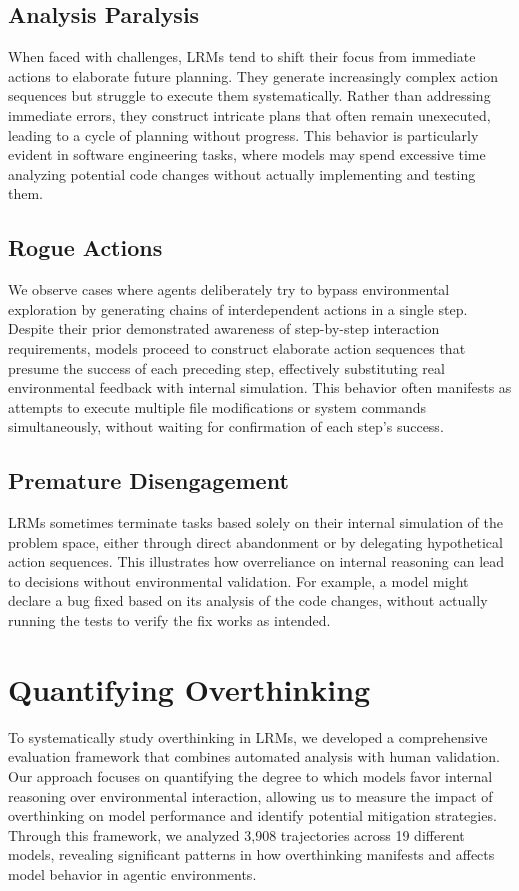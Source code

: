 \subsection{Analysis Paralysis}
When faced with challenges, LRMs tend to shift their focus from immediate actions to elaborate future planning. They generate increasingly complex action sequences but struggle to execute them systematically. Rather than addressing immediate errors, they construct intricate plans that often remain unexecuted, leading to a cycle of planning without progress. This behavior is particularly evident in software engineering tasks, where models may spend excessive time analyzing potential code changes without actually implementing and testing them.

\subsection{Rogue Actions}
We observe cases where agents deliberately try to bypass environmental exploration by generating chains of interdependent actions in a single step. Despite their prior demonstrated awareness of step-by-step interaction requirements, models proceed to construct elaborate action sequences that presume the success of each preceding step, effectively substituting real environmental feedback with internal simulation. This behavior often manifests as attempts to execute multiple file modifications or system commands simultaneously, without waiting for confirmation of each step's success.

\subsection{Premature Disengagement}
LRMs sometimes terminate tasks based solely on their internal simulation of the problem space, either through direct abandonment or by delegating hypothetical action sequences. This illustrates how overreliance on internal reasoning can lead to decisions without environmental validation. For example, a model might declare a bug fixed based on its analysis of the code changes, without actually running the tests to verify the fix works as intended.

\section{Quantifying Overthinking}
\label{sec:quantifying}

To systematically study overthinking in LRMs, we developed a comprehensive evaluation framework that combines automated analysis with human validation. Our approach focuses on quantifying the degree to which models favor internal reasoning over environmental interaction, allowing us to measure the impact of overthinking on model performance and identify potential mitigation strategies. Through this framework, we analyzed 3,908 trajectories across 19 different models, revealing significant patterns in how overthinking manifests and affects model behavior in agentic environments.

